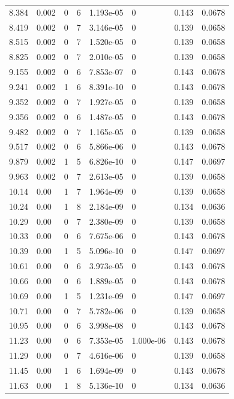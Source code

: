 \documentclass[preview]{standalone}
\begin{document}
{{{\begin{tabular}{L{1.2cm}C{1.2cm} C{0.3cm}C{0.5cm} C{1.4cm}C{1.4cm} C{1.4cm}C{1.4cm}}
  8.384  &  0.002  & 0     &  6 &  1.193e-05  & 0  & 0.143 &  0.0678   \\ 
  8.419  &  0.002  & 0     &  7 &  3.146e-05  & 0  & 0.139 &  0.0658   \\ 
  8.515  &  0.002  & 0     &  7 &  1.520e-05  & 0  & 0.139 &  0.0658   \\ 
  8.825  &  0.002  & 0     &  7 &  2.010e-05  & 0  & 0.139 &  0.0658   \\ 
  9.155  &  0.002  & 0     &  6 &  7.853e-07  & 0  & 0.143 &  0.0678   \\ 
  9.241  &  0.002  & 1     &  6 &  8.391e-10  & 0  & 0.143 &  0.0678   \\ 
  9.352  &  0.002  & 0     &  7 &  1.927e-05  & 0  & 0.139 &  0.0658   \\ 
  9.356  &  0.002  & 0     &  6 &  1.487e-05  & 0  & 0.143 &  0.0678   \\ 
  9.482  &  0.002  & 0     &  7 &  1.165e-05  & 0  & 0.139 &  0.0658   \\ 
  9.517  &  0.002  & 0     &  6 &  5.866e-06  & 0  & 0.143 &  0.0678   \\ 
  9.879  &  0.002  & 1     &  5 &  6.826e-10  & 0  & 0.147 &  0.0697   \\ 
  9.963  &  0.002  & 0     &  7 &  2.613e-05  & 0  & 0.139 &  0.0658   \\ 
  10.14  &  0.00  & 1     &  7 &  1.964e-09  & 0  & 0.139 &  0.0658   \\ 
  10.24  &  0.00  & 1     &  8 &  2.184e-09  & 0  & 0.134 &  0.0636   \\ 
  10.29  &  0.00  & 0     &  7 &  2.380e-09  & 0  & 0.139 &  0.0658   \\ 
  10.33  &  0.00  & 0     &  6 &  7.675e-06  & 0  & 0.143 &  0.0678   \\ 
  10.39  &  0.00  & 1     &  5 &  5.096e-10  & 0  & 0.147 &  0.0697   \\ 
  10.61  &  0.00  & 0     &  6 &  3.973e-05  & 0  & 0.143 &  0.0678   \\ 
  10.66  &  0.00  & 0     &  6 &  1.889e-05  & 0  & 0.143 &  0.0678   \\ 
  10.69  &  0.00  & 1     &  5 &  1.231e-09  & 0  & 0.147 &  0.0697   \\ 
  10.71  &  0.00  & 0     &  7 &  5.782e-06  & 0  & 0.139 &  0.0658   \\ 
  10.95  &  0.00  & 0     &  6 &  3.998e-08  & 0  & 0.143 &  0.0678   \\ 
  11.23  &  0.00  & 0     &  6 &  7.353e-05  & 1.000e-06  & 0.143 &  0.0678   \\ 
  11.29  &  0.00  & 0     &  7 &  4.616e-06  & 0  & 0.139 &  0.0658   \\ 
  11.45  &  0.00  & 1     &  6 &  1.694e-09  & 0  & 0.143 &  0.0678   \\ 
  11.63  &  0.00  & 1     &  8 &  5.136e-10  & 0  & 0.134 &  0.0636   \\ 
\hline 
\end{tabular} 

}}}
\end{document}

